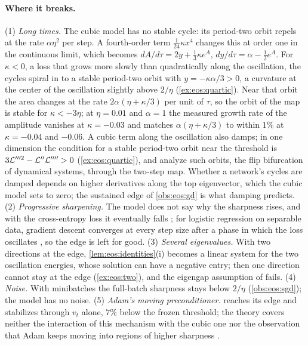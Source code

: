 \begin{refsection}
\paragraph{Where it breaks.} (1) \emph{Long times.} The cubic model has no stable cycle: its period-two orbit repels at the rate $\alpha\eta^2$ per step. A fourth-order term $\frac1{24}\kappa x^4$ changes this at order one in the continuous limit, which becomes $dA/d\tau=2y+\frac13\kappa e^A$, $dy/d\tau=\alpha-\frac12e^A$. For $\kappa<0$, a loss that grows more slowly than quadratically along the oscillation, the cycles spiral in to a stable period-two orbit with $y=-\kappa\alpha/3>0$, a curvature at the center of the oscillation slightly above $2/\eta$ (\cref{ex:eos:quartic}). Near that orbit the area changes at the rate $2\alpha(\eta+\kappa/3)$ per unit of $\tau$, so the orbit of the map is stable for $\kappa<-3\eta$; at $\eta=0.01$ and $\alpha=1$ the measured growth rate of the amplitude vanishes at $\kappa=-0.03$ and matches $\alpha(\eta+\kappa/3)$ to within $1\%$ at $\kappa=-0.04$ and $-0.06$. A cubic term along the oscillation also damps; in one dimension the condition for a stable period-two orbit near the threshold is $3\mathcal{L}'''^2-\mathcal{L}''\mathcal{L}''''>0$ (\cref{ex:eos:quartic}), and \textcite{ChenBruna2023} analyze such orbits, the flip bifurcation of dynamical systems, through the two-step map. Whether a network's cycles are damped depends on higher derivatives along the top eigenvector, which the cubic model sets to zero; the sustained edge of \cref{obs:eos:gd} is what damping predicts. (2) \emph{Progressive sharpening.} The model does not say why the sharpness rises, and with the cross-entropy loss it eventually falls \parencite{CohenEtAl2021}; for logistic regression on separable data, gradient descent converges at every step size after a phase in which the loss oscillates \parencite{WuBravermanLee2023,WuEtAl2024}, so the edge is left for good. (3) \emph{Several eigenvalues.} With two directions at the edge, \cref{lem:eos:identities}(i) becomes a linear system for the two oscillation energies, whose solution can have a negative entry; then one direction cannot stay at the edge (\cref{ex:eos:two}), and the eigengap assumption of \textcite{DamianNichaniLee2023} fails. (4) \emph{Noise.} With minibatches the full-batch sharpness stays below $2/\eta$ (\cref{obs:eos:sgd}); the model has no noise. (5) \emph{Adam's moving preconditioner.}  reaches its edge and stabilizes through $v_t$ alone, $7\%$ below the frozen threshold; the theory covers neither the interaction of this mechanism with the cubic one nor the observation that Adam keeps moving into regions of higher sharpness \parencite{CohenEtAl2022}.


\end{refsection}
